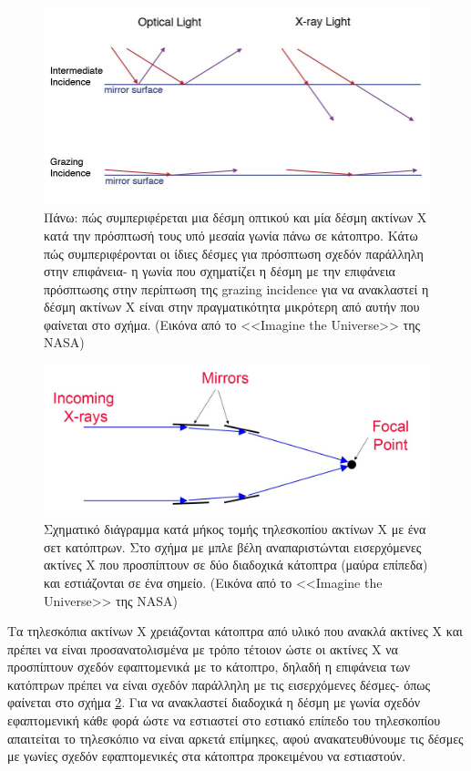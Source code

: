 \begin{figure}
 \begin{center}
 \includegraphics[width=0.7\linewidth]{Figures/grazing_incidence.jpg}
 \caption{Πάνω: πώς συμπεριφέρεται μια δέσμη οπτικού και μία δέσμη ακτίνων Χ κατά την πρόσπτωσή τους υπό μεσαία γωνία πάνω σε κάτοπτρο. Κάτω πώς συμπεριφέρονται οι ίδιες δέσμες για πρόσπτωση σχεδόν παράλληλη στην επιφάνεια- η γωνία που σχηματίζει η δέσμη με την επιφάνεια πρόσπτωσης στην περίπτωση της \textlatin{grazing incidence} για να ανακλαστεί η δέσμη ακτίνων Χ είναι στην πραγματικότητα μικρότερη από αυτήν που φαίνεται στο σχήμα. (Εικόνα από το <<\textlatin{Imagine the Universe}>> της \textlatin{NASA})}
 \label{fig:grazing_incidence}
 \end{center}
 \end{figure}
  
\begin{figure}
 \begin{center}
 \includegraphics[width=0.7\linewidth]{Figures/xray_telescope_1mirror.jpg}
 \caption{Σχηματικό διάγραμμα κατά μήκος τομής τηλεσκοπίου ακτίνων Χ με ένα σετ κατόπτρων. Στο σχήμα με μπλε βέλη αναπαριστώνται εισερχόμενες ακτίνες Χ που προσπίπτουν σε δύο διαδοχικά κάτοπτρα (μαύρα επίπεδα) και εστιάζονται σε ένα σημείο. (Εικόνα από το <<\textlatin{Imagine the Universe}>> της \textlatin{NASA})}
 \label{fig:xray_telescope_1mirror}
 \end{center}
 \end{figure}
 
Τα τηλεσκόπια ακτίνων Χ χρειάζονται κάτοπτρα από υλικό που ανακλά ακτίνες Χ και πρέπει να είναι προσανατολισμένα με τρόπο τέτοιον ώστε οι ακτίνες Χ να προσπίπτουν σχεδόν εφαπτομενικά με το κάτοπτρο, δηλαδή η επιφάνεια των κατόπτρων πρέπει να είναι σχεδόν παράλληλη με τις εισερχόμενες δέσμες- όπως φαίνεται στο σχήμα \ref{fig:xray_telescope_1mirror}. Για να ανακλαστεί διαδοχικά η δέσμη με γωνία σχεδόν εφαπτομενική κάθε φορά ώστε να εστιαστεί στο εστιακό επίπεδο του τηλεσκοπίου απαιτείται το τηλεσκόπιο να είναι αρκετά επίμηκες, αφού ανακατευθύνουμε τις δέσμες με γωνίες σχεδόν εφαπτομενικές στα κάτοπτρα προκειμένου να εστιαστούν.

